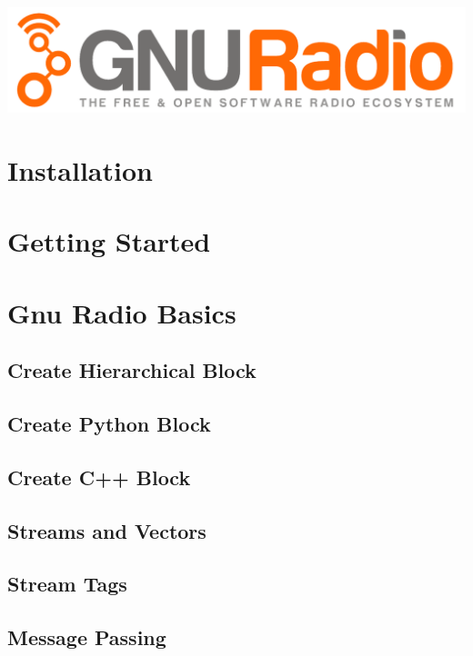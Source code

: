 \documentclass[10pt]{article}
\begin{document}
\includegraphics[width=0.95\linewidth]{gnuradio_logo_web}


\begin{multicols*}{3}
\section{Installation}




\section{Getting Started}


\section{Gnu Radio Basics}

\subsection{Create Hierarchical Block}


\subsection{Create Python Block}


\subsection{Create C++ Block}

\subsection{Streams and Vectors}

\subsection{Stream Tags}

\subsection{Message Passing}


\end{multicols*}
\end{document}
